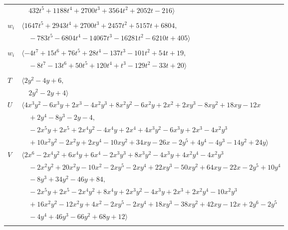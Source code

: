 \documentclass[11pt]{article}
\begin{document}
\begin{longtable}{@{}ll@{}}
 & $\quad 432t^{5}+1188t^{4}+2700t^{3}+3564t^{2}+2052t-216\rangle$\\
\addlinespace[2pt]
\multicolumn{2}{@{}p{0.97\textwidth}@{}}{$i=44$, $D_i=27$, $\rho_{ij}$: $3{:}1, \allowbreak 4{:}2, \allowbreak 5{:}2, \allowbreak 8{:}2, \allowbreak 10{:}2, \allowbreak 11{:}1, \allowbreak 13{:}1, \allowbreak 17{:}1, \allowbreak 18{:}1, \allowbreak 21{:}2, \allowbreak 25{:}2, \allowbreak 29{:}2, \allowbreak 30{:}2, \allowbreak 38{:}2$}\\
$w_i$ & $\langle 1647t^{5}+2943t^{4}+2700t^{3}+2457t^{2}+5157t+6804,$\\
 & $\quad -783t^{5}-6804t^{4}-14067t^{3}-16281t^{2}-6210t+405\rangle$\\
\addlinespace[2pt]
\multicolumn{2}{@{}p{0.97\textwidth}@{}}{$i=45$, $D_i=1$, $\rho_{ij}$: $3{:}1, \allowbreak 9{:}1, \allowbreak 10{:}1, \allowbreak 11{:}2, \allowbreak 15{:}2, \allowbreak 19{:}1, \allowbreak 20{:}2, \allowbreak 23{:}2, \allowbreak 28{:}2, \allowbreak 39{:}2, \allowbreak 41{:}2$}\\
$w_i$ & $\langle -4t^{7}+15t^{6}+76t^{5}+28t^{4}-137t^{3}-101t^{2}+54t+19,$\\
 & $\quad -8t^{7}-13t^{6}+50t^{5}+120t^{4}+t^{3}-129t^{2}-33t+20\rangle$\\
\addlinespace[2pt]
\multicolumn{2}{@{}p{0.97\textwidth}@{}}{$i=46$, $D_i=1$, $\rho_{ij}$: $2{:}1, \allowbreak 7{:}2, \allowbreak 11{:}2, \allowbreak 17{:}1, \allowbreak 43{:}2$}\\
$T$ & $\langle 2y^{2}-4y+6,$\\
 & $\quad 2y^{2}-2y+4\rangle$\\
$U$ & $\langle 4x^{3}y^{2}-6x^{3}y+2x^{3}-4x^{2}y^{3}+8x^{2}y^{2}-6x^{2}y+2x^{2}+2xy^{3}-8xy^{2}+18xy-12x$\\
 & $\quad +2y^{4}-8y^{3}-2y-4,$\\
 & $\quad -2x^{5}y+2x^{5}+2x^{4}y^{2}-4x^{4}y+2x^{4}+4x^{3}y^{2}-6x^{3}y+2x^{3}-4x^{2}y^{3}$\\
 & $\quad +10x^{2}y^{2}-2x^{2}y+2xy^{4}-10xy^{2}+34xy-26x-2y^{5}+4y^{4}-4y^{3}-14y^{2}+24y\rangle$\\
$V$ & $\langle 2x^{6}-2x^{4}y^{2}+6x^{4}y+6x^{4}-2x^{3}y^{3}+8x^{3}y^{2}-4x^{3}y+4x^{2}y^{4}-4x^{2}y^{3}$\\
 & $\quad -2x^{2}y^{2}+20x^{2}y-10x^{2}-2xy^{5}-2xy^{4}+22xy^{3}-50xy^{2}+64xy-22x-2y^{5}+10y^{4}$\\
 & $\quad -8y^{3}+34y^{2}-46y+84,$\\
 & $\quad -2x^{5}y+2x^{5}-2x^{4}y^{2}+8x^{4}y+2x^{3}y^{2}-4x^{3}y+2x^{3}+2x^{2}y^{4}-10x^{2}y^{3}$\\
 & $\quad +16x^{2}y^{2}-12x^{2}y+4x^{2}-2xy^{5}-2xy^{4}+18xy^{3}-38xy^{2}+42xy-12x+2y^{6}-2y^{5}$\\
 & $\quad -4y^{4}+46y^{3}-66y^{2}+68y+12\rangle$\\
\addlinespace[2pt]
\end{longtable}
\endgroup
\end{document}
